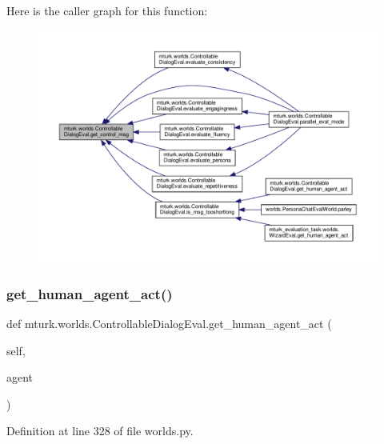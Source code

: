 Here is the caller graph for this function\+:
\nopagebreak
\begin{figure}[H]
\begin{center}
\leavevmode
\includegraphics[width=350pt]{classmturk_1_1worlds_1_1ControllableDialogEval_ae626e15abbeee2b200a4b53dd43c961d_icgraph}
\end{center}
\end{figure}
\mbox{\label{classmturk_1_1worlds_1_1ControllableDialogEval_af81be6365b8b4be98cb300aa51f1de9c}} 
\subsubsection{\texorpdfstring{get\+\_\+human\+\_\+agent\+\_\+act()}{get\_human\_agent\_act()}}
{\footnotesize\ttfamily def mturk.\+worlds.\+Controllable\+Dialog\+Eval.\+get\+\_\+human\+\_\+agent\+\_\+act (\begin{DoxyParamCaption}\item[{}]{self,  }\item[{}]{agent }\end{DoxyParamCaption})}



Definition at line 328 of file worlds.\+py.



